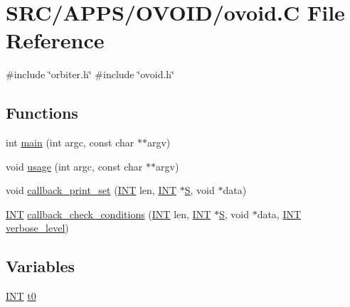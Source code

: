 \hypertarget{_o_v_o_i_d_2ovoid_8_c}{}\section{S\+R\+C/\+A\+P\+P\+S/\+O\+V\+O\+I\+D/ovoid.C File Reference}
\label{_o_v_o_i_d_2ovoid_8_c}
{\ttfamily \#include \char`\"{}orbiter.\+h\char`\"{}}\newline
{\ttfamily \#include \char`\"{}ovoid.\+h\char`\"{}}\newline
\subsection*{Functions}
\begin{DoxyCompactItemize}
\item 
int \mbox{\hyperlink{_o_v_o_i_d_2ovoid_8_c_a217dbf8b442f20279ea00b898af96f52}{main}} (int argc, const char $\ast$$\ast$argv)
\item 
void \mbox{\hyperlink{_o_v_o_i_d_2ovoid_8_c_a4f6af65d82bb5ceda6c2bdbee492b8f8}{usage}} (int argc, const char $\ast$$\ast$argv)
\item 
void \mbox{\hyperlink{_o_v_o_i_d_2ovoid_8_c_a0d469d33882a9fcc74da463afe8dd36f}{callback\+\_\+print\+\_\+set}} (\mbox{\hyperlink{galois_8h_a09fddde158a3a20bd2dcadb609de11dc}{I\+NT}} len, \mbox{\hyperlink{galois_8h_a09fddde158a3a20bd2dcadb609de11dc}{I\+NT}} $\ast$\mbox{\hyperlink{simeon_8_c_adab47f8243f1b5a2c31df2535d6b37d0}{S}}, void $\ast$data)
\item 
\mbox{\hyperlink{galois_8h_a09fddde158a3a20bd2dcadb609de11dc}{I\+NT}} \mbox{\hyperlink{_o_v_o_i_d_2ovoid_8_c_ae3d42bbe9fc8a3eaf61cf43d52cb8613}{callback\+\_\+check\+\_\+conditions}} (\mbox{\hyperlink{galois_8h_a09fddde158a3a20bd2dcadb609de11dc}{I\+NT}} len, \mbox{\hyperlink{galois_8h_a09fddde158a3a20bd2dcadb609de11dc}{I\+NT}} $\ast$\mbox{\hyperlink{simeon_8_c_adab47f8243f1b5a2c31df2535d6b37d0}{S}}, void $\ast$data, \mbox{\hyperlink{galois_8h_a09fddde158a3a20bd2dcadb609de11dc}{I\+NT}} \mbox{\hyperlink{simeon_8_c_a818073fbcc2f439e7c56952f67386122}{verbose\+\_\+level}})
\end{DoxyCompactItemize}
\subsection*{Variables}
\begin{DoxyCompactItemize}
\item 
\mbox{\hyperlink{galois_8h_a09fddde158a3a20bd2dcadb609de11dc}{I\+NT}} \mbox{\hyperlink{_o_v_o_i_d_2ovoid_8_c_a4268f4fe222ffb119218a0199f5e1904}{t0}}
\end{DoxyCompactItemize}


